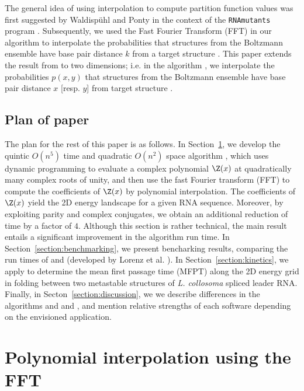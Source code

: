 The general idea of using
interpolation to compute partition function values was first suggested
by Waldisp\"uhl and Ponty in the context of the
{\tt RNAmutants} program \citep{waldispuhlPontyRecomb}. Subsequently,
we used the Fast Fourier Transform (FFT) in our algorithm
\fftbor \citep{fftbor}  to interpolate the
probabilities \pk that structures from the Boltzmann
ensemble have base pair distance $k$ from a target structure \strSt.
This paper extends the result from \citep{fftbor} to two dimensions; i.e.
in the algorithm \ffttwo,
we interpolate the probabilities $p(x,y)$ that
structures from the Boltzmann ensemble have base pair distance
$x$ [resp. $y$] from target structure .

\subsection{Plan of paper}

The plan for the rest of this paper is as follows. In
Section~\ref{section:approach}, we develop the quintic
$O(n^5)$ time and quadratic $O(n^2)$ space algorithm \ffttwo,
which uses dynamic programming to evaluate a complex polynomial
$\Z(x)$ at quadratically many complex roots of unity, and then use the fast
Fourier transform (FFT) to compute the coefficients of $\Z(x)$ by
polynomial interpolation. The coefficients of $\Z(x)$ yield the 2D
energy landscape for a given RNA sequence. Moreover, by exploiting
parity and complex conjugates, we obtain an additional reduction of time
by a factor of $4$. Although this section is rather technical, the
main result entails a significant improvement in the algorithm
run time.
In Section~\ref{section:benchmarking}, we present bencharking results,
comparing the run times of \ffttwo and \rnatwofold
(developed by Lorenz et al.  \citep{hofacker:RNAbor2D}).
In Section~\ref{section:kinetics}, we apply \ffttwo to determine
the mean first passage time (MFPT) along the 2D energy grid in folding
between two metastable structures of {\em L. collosoma} spliced leader
RNA.
Finally, in Secton~\ref{section:discussion}, we we describe
differences in the algorithms \rnatwofold and
and \ffttwo, and mention relative strengths of each software
depending on the envisioned application.

\section{Polynomial interpolation using the FFT}
\label{section:approach}

